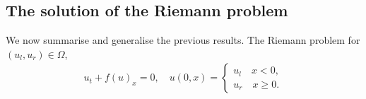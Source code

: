 \documentclass[10pt]{article}
\numberwithin{equation}{section}
\begin{document}



\subsection{The solution of the Riemann problem}
We now summarise and generalise the previous results. The Riemann problem for $(u_l, u_r) \in \Omega$, \begin{align}
    u_t + f(u)_x = 0,\quad  u(0,x) = \begin{cases} 
    u_l  \quad x < 0, \\
    u_r \quad x \geq 0 .
    \end{cases}
    \label{Eq:RPFinal}
\end{align}

\end{document}
